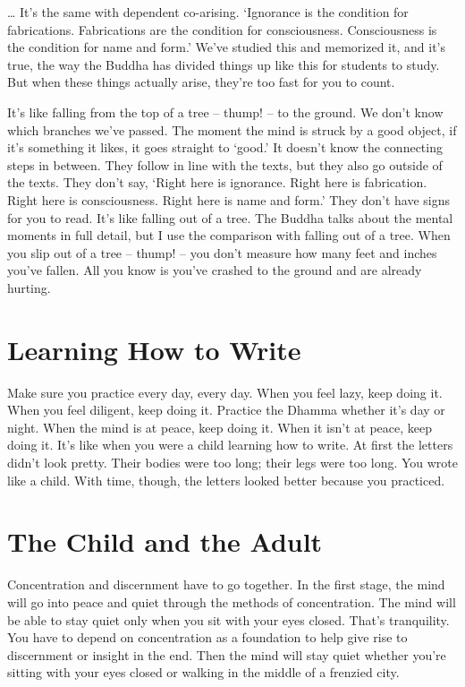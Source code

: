 \ldots{} It's the same with dependent co-arising. `Ignorance is the condition for fabrications. Fabrications are the condition for consciousness. Consciousness is the condition for name and form.' We've studied this and memorized it, and it's true, the way the Buddha has divided things up like this for students to study. But when these things actually arise, they're too fast for you to count.

It's like falling from the top of a tree -- thump! -- to the ground. We don't know which branches we've passed. The moment the mind is struck by a good object, if it's something it likes, it goes straight to `good.' It doesn't know the connecting steps in between. They follow in line with the texts, but they also go outside of the texts. They don't say, `Right here is ignorance. Right here is fabrication. Right here is consciousness. Right here is name and form.' They don't have signs for you to read. It's like falling out of a tree. The Buddha talks about the mental moments in full detail, but I use the comparison with falling out of a tree. When you slip out of a tree -- thump! -- you don't measure how many feet and inches you've fallen. All you know is you've crashed to the ground and are already hurting.

\clearpage

\section{Learning How to Write}

Make sure you practice every day, every day. When you feel lazy, keep doing it. When you feel diligent, keep doing it. Practice the Dhamma whether it's day or night. When the mind is at peace, keep doing it. When it isn't at peace, keep doing it. It's like when you were a child learning how to write. At first the letters didn't look pretty. Their bodies were too long; their legs were too long. You wrote like a child. With time, though, the letters looked better because you practiced.

\vspace*{-\baselineskip}
\section{The Child and the Adult}

Concentration and discernment have to go together. In the first stage, the mind will go into peace and quiet through the methods of concentration. The mind will be able to stay quiet only when you sit with your eyes closed. That's tranquility. You have to depend on concentration as a foundation to help give rise to discernment or insight in the end. Then the mind will stay quiet whether you're sitting with your eyes closed or walking in the middle of a frenzied city. 

